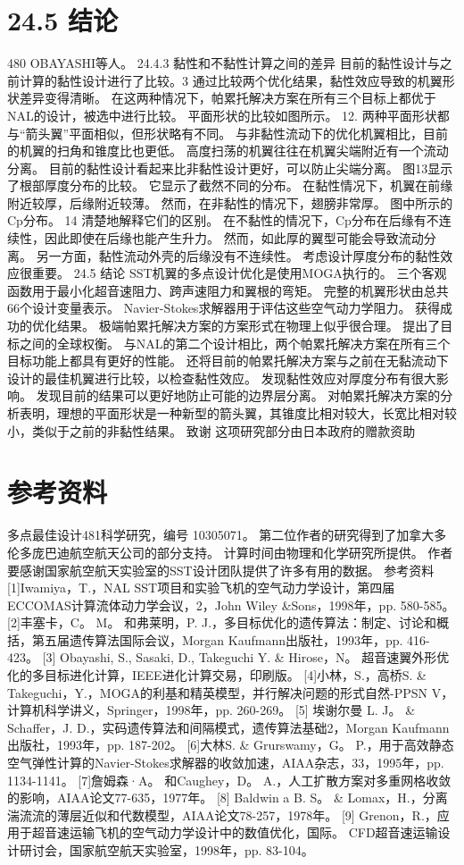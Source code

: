 \documentclass[UTF8,11pt,a4paper,openany,fontset=fandol]{ctexbook}
\begin{document}
\section{24.5 结论}
480 OBAYASHI等人。 24.4.3 黏性和不黏性计算之间的差异 目前的黏性设计与之前计算的黏性设计进行了比较。3 通过比较两个优化结果，黏性效应导致的机翼形状差异变得清晰。 在这两种情况下，帕累托解决方案在所有三个目标上都优于NAL的设计，被选中进行比较。 平面形状的比较如图所示。 12. 两种平面形状都与“箭头翼”平面相似，但形状略有不同。 与非黏性流动下的优化机翼相比，目前的机翼的扫角和锥度比也更低。 高度扫荡的机翼往往在机翼尖端附近有一个流动分离。 目前的黏性设计看起来比非黏性设计更好，可以防止尖端分离。 图13显示了根部厚度分布的比较。 它显示了截然不同的分布。 在黏性情况下，机翼在前缘附近较厚，后缘附近较薄。 然而，在非黏性的情况下，翅膀非常厚。 图中所示的Cp分布。 14 清楚地解释它们的区别。 在不黏性的情况下，Cp分布在后缘有不连续性，因此即使在后缘也能产生升力。 然而，如此厚的翼型可能会导致流动分离。 另一方面，黏性流动外壳的后缘没有不连续性。 考虑设计厚度分布的黏性效应很重要。 24.5 结论 SST机翼的多点设计优化是使用MOGA执行的。 三个客观函数用于最小化超音速阻力、跨声速阻力和翼根的弯矩。 完整的机翼形状由总共66个设计变量表示。 Navier-Stokes求解器用于评估这些空气动力学阻力。 获得成功的优化结果。 极端帕累托解决方案的方案形式在物理上似乎很合理。 提出了目标之间的全球权衡。 与NAL的第二个设计相比，两个帕累托解决方案在所有三个目标功能上都具有更好的性能。 还将目前的帕累托解决方案与之前在无黏流动下设计的最佳机翼进行比较，以检查黏性效应。 发现黏性效应对厚度分布有很大影响。 发现目前的结果可以更好地防止可能的边界层分离。 对帕累托解决方案的分析表明，理想的平面形状是一种新型的箭头翼，其锥度比相对较大，长宽比相对较小，类似于之前的非黏性结果。 致谢 这项研究部分由日本政府的赠款资助

\section{参考资料}
多点最佳设计481科学研究，编号 10305071。 第二位作者的研究得到了加拿大多伦多庞巴迪航空航天公司的部分支持。 计算时间由物理和化学研究所提供。 作者要感谢国家航空航天实验室的SST设计团队提供了许多有用的数据。 参考资料[1]Iwamiya，T.，NAL SST项目和实验飞机的空气动力学设计，第四届ECCOMAS计算流体动力学会议，2，John Wiley \&Sons，1998年，pp. 580-585。 [2]丰塞卡，C。 M。 和弗莱明，P. J.，多目标优化的遗传算法：制定、讨论和概括，第五届遗传算法国际会议，Morgan Kaufmann出版社，1993年，pp. 416-423。 [3] Obayashi, S., Sasaki, D., Takeguchi Y. \& Hirose，N。 超音速翼外形优化的多目标进化计算，IEEE进化计算交易，印刷版。 [4]小林，S.，高桥S. \& Takeguchi，Y.，MOGA的利基和精英模型，并行解决问题的形式自然-PPSN V，计算机科学讲义，Springer，1998年，pp. 260-269。 [5] 埃谢尔曼 L. J。 \& Schaffer，J. D.，实码遗传算法和间隔模式，遗传算法基础2，Morgan Kaufmann出版社，1993年，pp. 187-202。 [6]大林S. \& Grurswamy，G。 P.，用于高效静态空气弹性计算的Navier-Stokes求解器的收敛加速，AIAA杂志，33，1995年，pp. 1134-1141。 [7]詹姆森·A。 和Caughey，D。 A.，人工扩散方案对多重网格收敛的影响，AIAA论文77-635，1977年。 [8] Baldwin a B. S。 \& Lomax，H.，分离湍流流的薄层近似和代数模型，AIAA论文78-257，1978年。 [9] Grenon，R.，应用于超音速运输飞机的空气动力学设计中的数值优化，国际。 CFD超音速运输设计研讨会，国家航空航天实验室，1998年，pp. 83-104。
\end{document}
